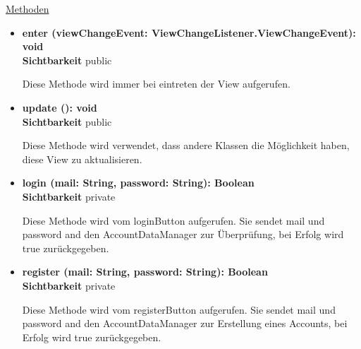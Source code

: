 \underline{Methoden}
\begin{itemize}
\itemsep0pt
\item \textbf{enter (viewChangeEvent: ViewChangeListener.ViewChangeEvent): void}\hfill\\
\textbf{Sichtbarkeit} public

Diese Methode wird immer bei eintreten der View aufgerufen.

\item \textbf{update (): void}\hfill\\
\textbf{Sichtbarkeit} public

Diese Methode wird verwendet, dass andere Klassen die Möglichkeit haben, diese View zu aktualisieren.


\item \textbf{login (mail: String, password: String): Boolean} \hfill\\ 
\textbf{Sichtbarkeit} private

Diese Methode wird vom loginButton aufgerufen. Sie sendet mail und password and den AccountDataManager zur Überprüfung, bei Erfolg wird true zurückgegeben.

\item \textbf{register (mail: String, password: String): Boolean}\hfill\\
\textbf{Sichtbarkeit} private

Diese Methode wird vom registerButton aufgerufen. Sie sendet mail und password and den AccountDataManager zur Erstellung eines Accounts, bei Erfolg wird true zurückgegeben.

\end{itemize}
